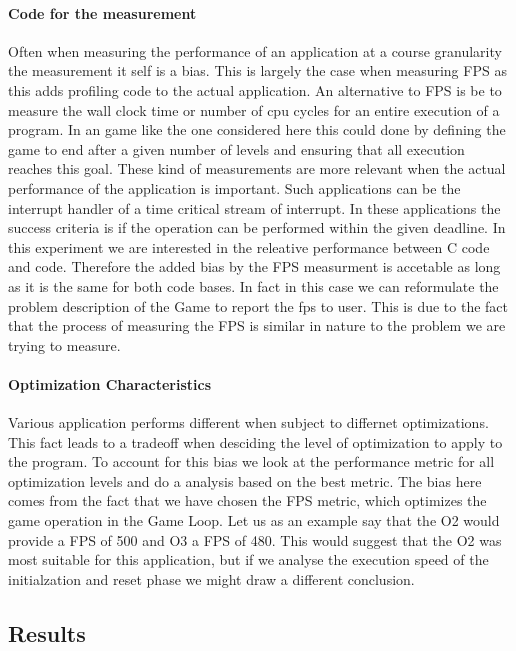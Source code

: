 \paragraph{Code for the measurement}
Often when measuring the performance of an application at a course granularity the measurement it self is a bias.
This is largely the case when measuring FPS as this adds profiling code to the actual application.
An alternative to FPS is be to measure the wall clock time or number of cpu cycles for an entire execution of a program.
In an game like the one considered here this could done by defining the game to end after a given number of levels and ensuring that all execution reaches this goal.
These kind of measurements are more relevant when the actual performance of the application is important.
Such applications can be the interrupt handler of a time critical stream of interrupt.
In these applications the success criteria is if the operation can be performed within the given deadline.
In this experiment we are interested in the releative performance between C code and \rust code.
Therefore the added bias by the FPS measurment is accetable as long as it is the same for both code bases.
In fact in this case we can reformulate the problem description of the Game to report the fps to user.
This is due to the fact that the process of measuring the FPS is similar in nature to the problem we are trying to measure.

\paragraph{Optimization Characteristics}
Various application performs different when subject to differnet optimizations.
This fact leads to a tradeoff when desciding the level of optimization to apply to the program.
To account for this bias we look at the performance metric for all optimization levels and do a analysis based on the best metric.
The bias here comes from the fact that we have chosen the FPS metric, which optimizes the game operation in the Game Loop.
Let us as an example say that the O2 would provide a FPS of 500 and O3 a FPS of 480.
This would suggest that the O2 was most suitable for this application, but if we analyse the execution speed of the initialzation and reset phase we might draw a different conclusion.

\subsection{Results}
\label{sec:perf:res}

